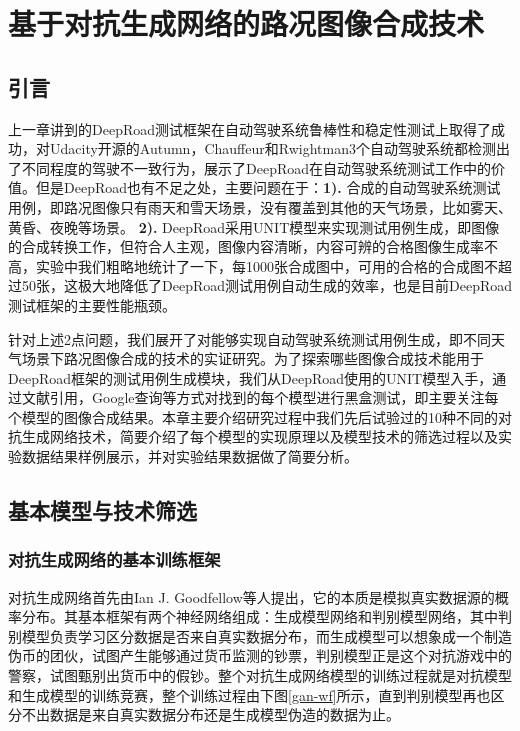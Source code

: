 \chapter{基于对抗生成网络的路况图像合成技术}

\section{引言}

上一章讲到的DeepRoad测试框架在自动驾驶系统鲁棒性和稳定性测试上取得了成功，对Udacity开源的Autumn\cite{autumn}，Chauffeur\cite{Chauffeur}和Rwightman\cite{Rwightman}3个自动驾驶系统都检测出了不同程度的驾驶不一致行为，展示了DeepRoad在自动驾驶系统测试工作中的价值。但是DeepRoad也有不足之处，主要问题在于：\textbf{1). }合成的自动驾驶系统测试用例，即路况图像只有雨天和雪天场景，没有覆盖到其他的天气场景，比如雾天、黄昏、夜晚等场景。 \textbf{2). }DeepRoad采用UNIT\cite{UNIT}模型来实现测试用例生成，即图像的合成转换工作，但符合人主观，图像内容清晰，内容可辨的合格图像生成率不高，实验中我们粗略地统计了一下，每1000张合成图中，可用的合格的合成图不超过50张，这极大地降低了DeepRoad测试用例自动生成的效率，也是目前DeepRoad测试框架的主要性能瓶颈。

针对上述2点问题，我们展开了对能够实现自动驾驶系统测试用例生成，即不同天气场景下路况图像合成的技术的实证研究。为了探索哪些图像合成技术能用于DeepRoad框架的测试用例生成模块，我们从DeepRoad使用的UNIT模型入手，通过文献引用，Google查询等方式对找到的每个模型进行黑盒测试，即主要关注每个模型的图像合成结果。本章主要介绍研究过程中我们先后试验过的10种不同的对抗生成网络技术，简要介绍了每个模型的实现原理以及模型技术的筛选过程以及实验数据结果样例展示，并对实验结果数据做了简要分析。

\section{基本模型与技术筛选}

\subsection{对抗生成网络的基本训练框架}

对抗生成网络\cite{GAN}首先由Ian J. Goodfellow等人提出，它的本质是模拟真实数据源的概率分布。其基本框架有两个神经网络组成：生成模型网络和判别模型网络，其中判别模型负责学习区分数据是否来自真实数据分布，而生成模型可以想象成一个制造伪币的团伙，试图产生能够通过货币监测的钞票，判别模型正是这个对抗游戏中的警察，试图甄别出货币中的假钞。整个对抗生成网络模型的训练过程就是对抗模型和生成模型的训练竞赛，整个训练过程由下图\ref{gan-wf}所示，直到判别模型再也区分不出数据是来自真实数据分布还是生成模型伪造的数据为止。

